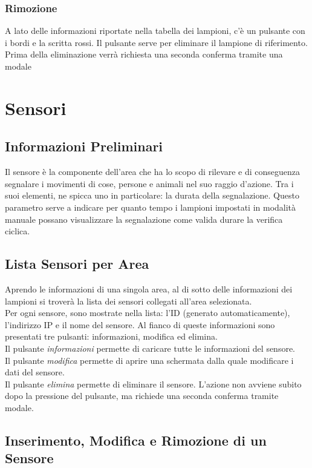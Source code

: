 \documentclass[a4paper, 12pt]{article}
\begin{document}
\subsubsection{Rimozione}
A lato delle informazioni riportate nella tabella dei lampioni, c'è un pulsante con i bordi e la scritta rossi. Il pulsante serve per eliminare il lampione di riferimento. Prima della eliminazione verrà richiesta una seconda conferma tramite una modale

\newpage
\section{Sensori}
\subsection{Informazioni Preliminari}
Il sensore è la componente dell'area che ha lo scopo di rilevare e di conseguenza segnalare i movimenti di cose, persone e animali nel suo raggio d'azione. Tra i suoi elementi, ne spicca uno in particolare: la durata della segnalazione. Questo parametro serve a indicare per quanto tempo i lampioni impostati in modalità manuale possano visualizzare la segnalazione come valida durare la verifica ciclica.
\subsection{Lista Sensori per Area}
Aprendo le informazioni di una singola area, al di sotto delle informazioni dei lampioni si troverà la lista dei sensori collegati all'area selezionata.\\
Per ogni sensore, sono mostrate nella lista: l'ID (generato automaticamente), l'indirizzo IP e il nome del sensore. Al fianco di queste informazioni sono presentati tre pulsanti: informazioni, modifica ed elimina. \\
Il pulsante \textit{informazioni} permette di caricare tutte le informazioni del sensore.\\
Il pulsante \textit{modifica} permette di aprire una schermata dalla quale modificare i dati del sensore.\\
Il pulsante \textit{elimina} permette di eliminare il sensore. L'azione non avviene subito dopo la pressione del pulsante, ma richiede una seconda conferma tramite modale. \\

\subsection{Inserimento, Modifica e Rimozione di un Sensore}
\end{document}
